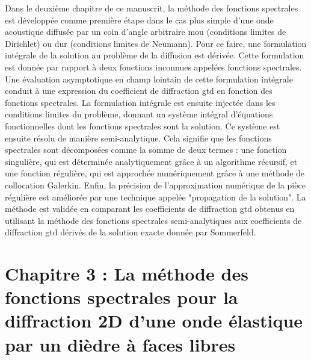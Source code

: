 Dans le deuxième chapitre de ce manuscrit, la méthode des fonctions spectrales est développée comme première étape dans le cas plus simple d'une onde acoustique diffusée par un coin d'angle arbitraire mou (conditions limites de Dirichlet) ou dur (conditions limites de Neumann). Pour ce faire, une formulation intégrale de la solution au problème de la diffusion est dérivée. Cette formulation est donnée par rapport à deux fonctions inconnues appelées fonctions spectrales. Une évaluation asymptotique en champ lointain de cette formulation intégrale conduit à une expression du coefficient de diffraction \acrshort{gtd} en fonction des fonctions spectrales. La formulation intégrale est ensuite injectée dans les conditions limites du problème, donnant un système intégral d'équations fonctionnelles dont les fonctions spectrales sont la solution. Ce système est ensuite résolu de manière semi-analytique. Cela signifie que les fonctions spectrales sont décomposées comme la somme de deux termes : une fonction singulière, qui est déterminée analytiquement grâce à un algorithme récursif, et une fonction régulière, qui est approchée numériquement grâce à une méthode de collocation Galerkin. Enfin, la précision de l'approximation numérique de la pièce régulière est améliorée par une technique appelée "propagation de la solution". La méthode est validée en comparant les coefficients de diffraction \acrshort{gtd} obtenus en utilisant la méthode des fonctions spectrales semi-analytiques aux coefficients de diffraction \acrshort{gtd} dérivés de la solution exacte donnée par Sommerfeld.

\section[Chapitre 3]{Chapitre 3 : La méthode des fonctions spectrales pour la diffraction 2D d'une onde élastique par un dièdre à faces libres}

